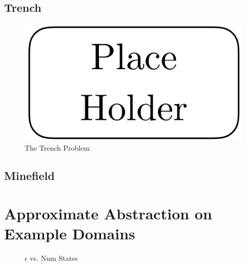 \documentclass{article}
\begin{document}
\subsection{Trench}



\begin{figure}[h]
\centering
\includegraphics[width=0.42\columnwidth]{figures/placeholder.png}
\caption{The Trench Problem}
\label{fig:trench}
\end{figure}

\subsection{Minefield}


\section{Approximate Abstraction on Example Domains}

\begin{figure}
\label{fig:eps-states}
\caption{$\epsilon$ vs. Num States}
\end{figure} 
\end{document}
